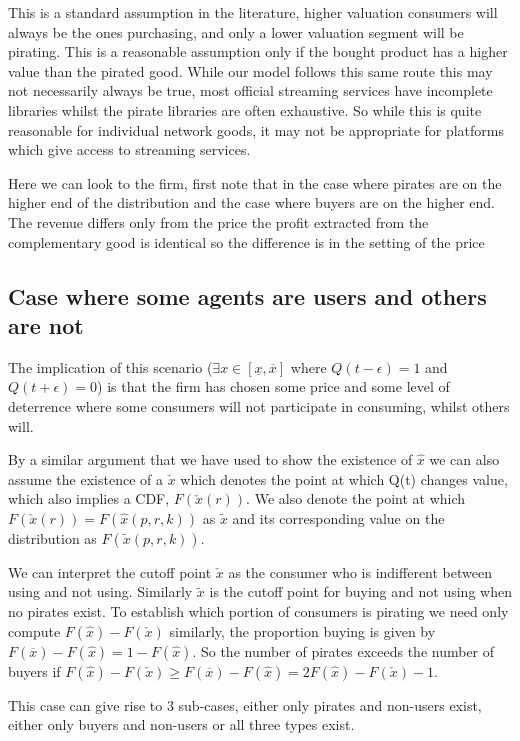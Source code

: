 \documentclass{article}
\begin{document}
This is a standard assumption in the literature, higher valuation consumers will always be the ones purchasing, and only a lower valuation segment will be pirating. This is a reasonable assumption only if the bought product has a higher value than the pirated good. While our model follows this same route this may not necessarily always be true, most  official streaming services have incomplete libraries whilst the pirate libraries are often exhaustive. So while this is quite reasonable for individual network goods, it may not be appropriate for platforms which give access to streaming services. 

Here we can look to the firm, first note that in the case where pirates are on the higher end of the distribution and the case where buyers are on the higher end. The revenue differs only from the price the profit extracted from the complementary good is identical so the difference is in the setting of the price

\subsection{Case where some agents are users and others are not}

The implication of this scenario ($\exists x \in [\underline{x},\overline{x}]$ where $Q(t-\epsilon)=1$ and $Q(t+\epsilon)=0$) is that the firm has chosen some price and some level of deterrence where some consumers will not participate in consuming, whilst others will. 

By a similar argument that we have used to show the existence of $\hat{x}$ we can also assume the existence of a $\check{x}$ which denotes the point at which Q(t) changes value, which also implies a CDF, $F(\check{x}(r))$. We also denote the point at which $F(\check{x}(r))=F(\hat{x}(p,r,k))$ as $\tilde{x}$ and its corresponding value on the distribution as $F(\tilde{x}(p,r,k))$. 

We can interpret the cutoff point $\check{x}$ as the consumer who is indifferent between using and not using. Similarly $\tilde{x}$ is the cutoff point for buying and not using when no pirates exist. To establish which portion of consumers is pirating we need only compute $F(\hat{x})-F(\check{x})$ similarly, the proportion buying is given by $F(\overline{x})-F(\hat{x})=1-F(\hat{x})$. So the number of pirates exceeds the number of buyers if $F(\hat{x})-F(\check{x}) \geq F(\overline{x})-F(\hat{x})=2F(\hat{x})-F(\check{x})-1$.

This case can give rise to 3 sub-cases, either only pirates and non-users exist, either only buyers and non-users or all three types exist. 
\end{document}
